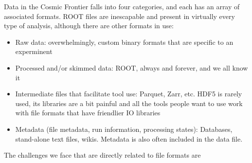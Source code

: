 \begin{comment}
Harrison B. Prosper, Sezen Sekmen, Gokhan Unel. ”Analysis Description Language: A DSL for HEP Analysis”, arXiv:2203.09886 [hep-ph] (pdf). (also relevant to CompF07)
- emphasizes the need for semantic analysis to make collaboration with theory easier
- also makes an analysis self-documenting (Amy: to a degree)
- prefers a language-independent DSL, an "external DSL" for easier interoperability
- identifies DSL requirements as (1) easily understood by a physicist, (2) unambiguous, (3) domain complete.  I feel like (1) and possibly (2) need more clarification for this to be a true requirement list
- people do use the Analysis Description Language (analysis schools, Future Circular Collider studies), not clear if the use is limited to a specific group or groups, no complete LHC analysis yet
- Obvious enhancement of existing DSL would be to re-write to target LLVM.  (Amy: huh, okay, maybe it is time to think about DSLs?)

C. Backhouse. ”The CAFAna framework for neutrino analysis”, arXiv:2203.13768 [hep-ex] (pdf). (also under NF01)
- I feel like I need to re-read this paper (Amy)
- ROOT format files
- has been used by multiple neutrino experiments!
- connected with STAN to provide MCMC + analytic derivatives
\end{comment}

Data in the Cosmic Frontier falls into four categories, and each has an array of associated formats.  ROOT files are inescapable and present in virtually every type of analysis, although there are other formats in use:   

\begin{itemize}
  \item Raw data: overwhelmingly, custom binary formats that are specific to an experminent
  \item Processed and/or skimmed data: ROOT, always and forever, and we all know it
  \item Intermediate files that facilitate tool use: Parquet, Zarr, etc.  HDF5 is rarely used, its libraries are a bit painful and all the tools people want to use work with file formats that have friendlier IO libraries
  \item Metadata (file metadata, run information, processing states): Databases, stand-alone text files, wikis.  Metadata is also often included in the data file.
\end{itemize}

The challenges we face that are directly related to file formats are

